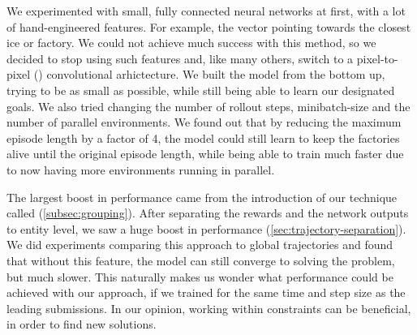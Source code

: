 \bigskip

\noindent We experimented with small, fully connected neural networks at first, with a lot of hand-engineered features. For example, the vector pointing towards the closest ice or factory. We could not achieve much success with this method, so we decided to stop using such features and, like many others, switch to a pixel-to-pixel (\cite{chen2023emergent}) convolutional arhictecture. We built the model from the bottom up, trying to be as small as possible, while still being able to learn our designated goals. We also tried changing the number of rollout steps, minibatch-size and the number of parallel environments. We found out that by reducing the maximum episode length by a factor of 4, the model could still learn to keep the factories alive until the original episode length, while being able to train much faster due to now having more environments running in parallel.

\bigskip

\noindent The largest boost in performance came from the introduction of our technique called  (\autoref{subsec:grouping}). After separating the rewards and the network outputs to entity level, we saw a huge boost in performance (\autoref{sec:trajectory-separation}). We did experiments comparing this approach to global trajectories and found that without this feature, the model can still converge to solving the problem, but much slower. This naturally makes us wonder what performance could be achieved with our approach, if we trained for the same time and step size as the leading submissions. In our opinion, working within constraints can be beneficial, in order to find new solutions.

